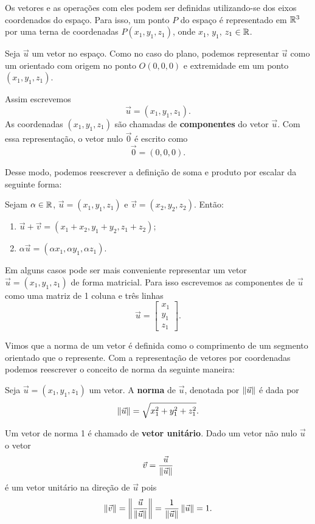Os vetores e as operações com eles podem ser definidas utilizando-se dos eixos coordenados do espaço. Para isso, um ponto $P$ do espaço é representado em $\mathbb{R}^3$ por uma terna de coordenadas $P(x_1, y_1,z_1)$, onde $x_1$, $y_1$, $z_1 \in \mathbb{R}$.

Seja $\vec{u}$ um vetor no espaço. Como no caso do plano, podemos representar $\vec{u}$ como um orientado com origem no ponto $O(0,0,0)$ e extremidade em um ponto $(x_1,y_1,z_1)$.

Assim escrevemos
\[
    \vec{u} = (x_1,y_1,z_1).
\]
As coordenadas $(x_1,y_1,z_1)$ são chamadas de \textbf{componentes} do vetor $\vec{u}$. Com essa representação, o vetor nulo $\vec{0}$ é escrito como
\[
    \vec{0} = (0,0,0).
\]

Desse modo, podemos reescrever a definição de soma e produto por escalar da seguinte forma:
\begin{definicao}
    Sejam $\alpha \in \mathbb{R}$, $\vec{u} = (x_1, y_1,z_1)$ e $\vec{v} = (x_2, y_2,z_2)$. Então:
    \begin{enumerate}
        \item $\vec{u} + \vec{v} = (x_1 + x_2, y_1 + y_2,z_1 + z_2)$;
        \item $\alpha \vec{u} = (\alpha x_1, \alpha y_1, \alpha z_1)$.
    \end{enumerate}
\end{definicao}

Em alguns casos pode ser mais conveniente representar um vetor $\vec{u} = (x_1, y_1,z_1)$ de forma matricial. Para isso escrevemos as componentes de $\vec{u}$ como uma matriz de 1 coluna e três linhas
\[
    \vec{u} = \begin{bmatrix}
        x_1 \\y_1\\z_1
    \end{bmatrix}.
\]

Vimos que a norma de um vetor é definida como o comprimento de um segmento orientado que o represente. Com a representação de vetores por coordenadas podemos reescrever o conceito de norma da seguinte maneira:
\begin{definicao}
    Seja $\vec{u} = (x_1, y_1,z_1)$ um vetor. A \textbf{norma} de $\vec{u}$, denotada por $\left\Vert{\vec{u}}\right\Vert$ é dada por
    \[
        \left\Vert{\vec{u}}\right\Vert = \sqrt{x_1^2 + y_1^2 + z_1^2}.
    \]
\end{definicao}

Um vetor de norma 1 é chamado de \textbf{vetor unitário}. Dado um vetor não nulo $\vec{u}$ o vetor
\[
    \vec{v} = \dfrac{\vec{u}}{\left\Vert{\vec{u}}\right\Vert}
\]
é um vetor unitário na direção de $\vec{u}$ pois
\[
    \left\Vert{\vec{v}}\right\Vert = \left\Vert{\dfrac{\vec{u}}{\left\Vert{\vec{u}}\right\Vert}}\right\Vert = \dfrac{1}{\left\Vert{\vec{u}}\right\Vert}\left\Vert{\vec{u}}\right\Vert = 1.
\]

